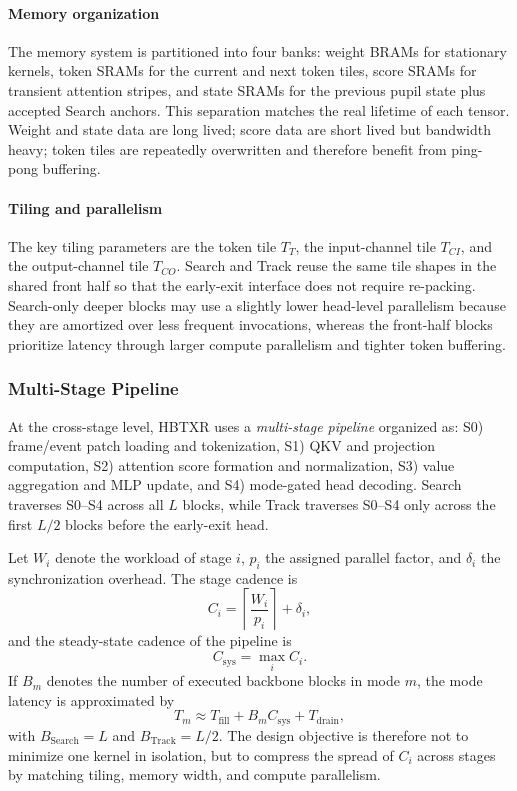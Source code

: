 \documentclass[journal]{IEEEtran}
\begin{document}
\paragraph*{Memory organization}
The memory system is partitioned into four banks: weight BRAMs for stationary kernels, token SRAMs for the current and next token tiles, score SRAMs for transient attention stripes, and state SRAMs for the previous pupil state plus accepted Search anchors. This separation matches the real lifetime of each tensor. Weight and state data are long lived; score data are short lived but bandwidth heavy; token tiles are repeatedly overwritten and therefore benefit from ping-pong buffering.

\paragraph*{Tiling and parallelism}
The key tiling parameters are the token tile $T_T$, the input-channel tile $T_{CI}$, and the output-channel tile $T_{CO}$. Search and Track reuse the same tile shapes in the shared front half so that the early-exit interface does not require re-packing. Search-only deeper blocks may use a slightly lower head-level parallelism because they are amortized over less frequent invocations, whereas the front-half blocks prioritize latency through larger compute parallelism and tighter token buffering.

\subsubsection{Multi-Stage Pipeline}
At the cross-stage level, HBTXR uses a \emph{multi-stage pipeline} organized as: S0) frame/event patch loading and tokenization, S1) QKV and projection computation, S2) attention score formation and normalization, S3) value aggregation and MLP update, and S4) mode-gated head decoding. Search traverses S0--S4 across all $L$ blocks, while Track traverses S0--S4 only across the first $L/2$ blocks before the early-exit head.

Let $W_i$ denote the workload of stage $i$, $p_i$ the assigned parallel factor, and $\delta_i$ the synchronization overhead. The stage cadence is
\begin{equation}
C_i=\left\lceil\frac{W_i}{p_i}\right\rceil+\delta_i,
\end{equation}
and the steady-state cadence of the pipeline is
\begin{equation}
C_{\mathrm{sys}}=\max_i C_i.
\end{equation}
If $B_m$ denotes the number of executed backbone blocks in mode $m$, the mode latency is approximated by
\begin{equation}
T_m \approx T_{\mathrm{fill}} + B_mC_{\mathrm{sys}} + T_{\mathrm{drain}},
\end{equation}
with $B_{\mathrm{Search}}=L$ and $B_{\mathrm{Track}}=L/2$. The design objective is therefore not to minimize one kernel in isolation, but to compress the spread of $C_i$ across stages by matching tiling, memory width, and compute parallelism.
\end{document}
